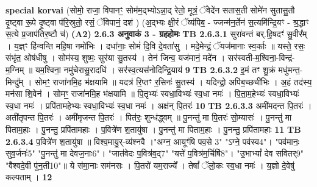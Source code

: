 \documentclass[17pt]{extarticle}
\begin{document}
                  \newline
                                                        \textbf{special korvai} \newline
              (सोमो॒ राजा॒ विपानꣳ॒॒ सोम॑म॒द्भ्योऽन्ना॒द् रेतो॒ मूत्रं॒ ॅवेदे॑न सतास॒ती सोमे॑न सुतासु॒तौ दृ॒ष्ट्वा रू॒पे दृ॒ष्ट्वा प॑रि॒स्रुतो॒ रसं॒ ॅविपानं॒ दश॑ ) \newline
                                (अ॒द्भ्यः क्षी॒रं ॅव्य॑पिब॒ - ज्जन्म॑न॒र्तेन॑ स॒त्यमि॑न्द्रि॒यꣳ - श्र॒द्धाꣳ स॒त्ये प्र॒जाप॑तिर॒ष्टौ च॑) \textbf{(A2)} \newline \newline
                \textbf{ 2.6.3     अनुवाकं   3 - ग्रहहोमः} \newline
                                \textbf{ TB 2.6.3.1} \newline
                  सुरा॑वन्तं बर्.हि॒षदꣳ॑ सु॒वीर᳚म् । य॒ज्ञ्ꣳ हि॑न्वन्ति महि॒षा नमो॑भिः । दधा॑नाः॒ सोमं॑ दि॒वि दे॒वता॑सु । मदे॒मेन्द्रं॒ ॅयज॑मानाः स्व॒र्काः ॥ यस्ते॒ रसः॒ संभृ॑त॒ ओष॑धीषु । सोम॑स्य॒ शुष्मः॒ सुर॑या सु॒तस्य॑ । तेन॑ जिन्व॒ यज॑मानं॒ मदे॑न । सर॑स्वती-म॒श्विना॒-विन्द्र॑-म॒ग्निम् ॥ यम॒श्विना॒ नमु॑चेरासु॒रादधि॑ । सर॑स्व॒त्यस॑नोदिन्द्रि॒याय॑ \textbf{ 9} \newline
                  \newline
                                \textbf{ TB 2.6.3.2} \newline
                  इ॒मं तꣳ शु॒क्रं मधु॑मन्त॒-मिन्दु᳚म् । सोमꣳ॒॒ राजा॑नमि॒ह भ॑क्षयामि ॥ यदत्र॑ रि॒प्तꣳ र॒सिनः॑ सु॒तस्य॑ । यदिन्द्रो॒ अपि॑ब॒च्छची॑भिः । अ॒हं तद॑स्य॒ मन॑सा शि॒वेन॑ । सोमꣳ॒॒ राजा॑नमि॒ह भ॑क्षयामि ॥ पि॒तृभ्यः॑ स्वधा॒विभ्यः॑ स्व॒धा नमः॑ । पि॒ता॒म॒हेभ्यः॑ स्वधा॒विभ्यः॑ स्व॒धा नमः॑ । प्रपि॑तामहेभ्यः स्वधा॒विभ्यः॑ स्व॒धा नमः॑ । अक्ष॑न् पि॒तरः॑ \textbf{ 10} \newline
                  \newline
                                \textbf{ TB 2.6.3.3} \newline
                  अमी॑मदन्त पि॒तरः॑ । अती॑तृपन्त पि॒तरः॑ । अमी॑मृजन्त पि॒तरः॑ । पित॑रः॒ शुन्ध॑द्ध्वम् ॥ पु॒नन्तु॑ मा पि॒तरः॑ सो॒म्यासः॑ । पु॒नन्तु॑ मा पिताम॒हाः । पु॒नन्तु॒ प्रपि॑तामहाः । प॒वित्रे॑ण श॒तायु॑षा । पु॒नन्तु॑ मा पिताम॒हाः । पु॒नन्तु॒ प्रपि॑तामहाः \textbf{ 11} \newline
                  \newline
                                \textbf{ TB 2.6.3.4} \newline
                  प॒वित्रे॑ण श॒तायु॑षा ॥ विश्व॒मायु॒र्-व्य॑श्नवै ।"अग्न॒ आयूꣳ॑षि पव॒से {3}" "ऽग्ने॒ पव॑स्व{4}"। "पव॑मानः॒ सुव॒र्जनः॑{5}" "पु॒नन्तु॑ मा देवज॒नाः{6}"। "जात॑वेदः प॒वित्र॑व॒द्{7}" "यत्ते॑ प॒वित्र॑म॒र्चिषि॑{8}"। "उ॒भाभ्यां᳚ देव सवितर्{9}" "वैश्वदे॒वी पु॑न॒ती{10}"॥ ये स॑मा॒नाः सम॑नसः । पि॒तरो॑ यम॒राज्ये᳚ । तेषां᳚ ॅलो॒कः स्व॒धा नमः॑ । य॒ज्ञो दे॒वेषु॑ कल्पताम् । \textbf{ 12} \newline
\end{document}
